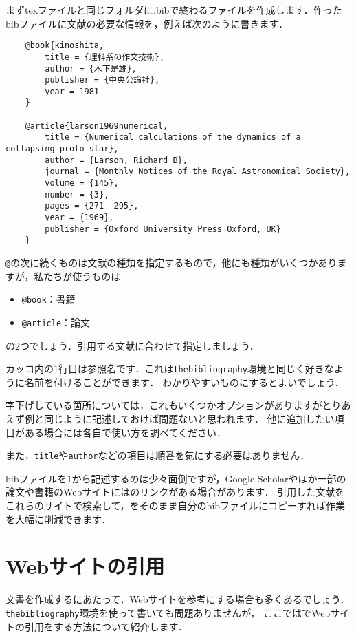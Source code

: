 \documentclass[a4paper, 11pt, uplatex]{jsreport}
\numberwithin{equation}{section}
\theoremstyle{definition}
\begin{document}
まずtexファイルと同じフォルダに.bibで終わるファイルを作成します．作ったbibファイルに文献の必要な情報を，例えば次のように書きます．
\begin{verbatim}
    @book{kinoshita,
        title = {理科系の作文技術},
        author = {木下是雄},
        publisher = {中央公論社},
        year = 1981
    }

    @article{larson1969numerical,
        title = {Numerical calculations of the dynamics of a collapsing proto-star},
        author = {Larson, Richard B},
        journal = {Monthly Notices of the Royal Astronomical Society},
        volume = {145},
        number = {3},
        pages = {271--295},
        year = {1969},
        publisher = {Oxford University Press Oxford, UK}
    }
\end{verbatim}

\verb|@|の次に続くものは文献の種類を指定するもので，他にも種類がいくつかありますが，私たちが使うものは
\begin{itemize}
    \item \verb|@book|：書籍
    \item \verb|@article|：論文
\end{itemize}
の2つでしょう．引用する文献に合わせて指定しましょう．

カッコ内の1行目は参照名です．これは\verb|thebibliography|環境と同じく好きなように名前を付けることができます．
わかりやすいものにするとよいでしょう．

字下げしている箇所については，これもいくつかオプションがありますがとりあえず例と同じように記述しておけば問題ないと思われます．
他に追加したい項目がある場合には各自で使い方を調べてください．

また，\verb|title|や\verb|author|などの項目は順番を気にする必要はありません．

bibファイルを1から記述するのは少々面倒ですが，Google Scholarやほか一部の論文や書籍のWebサイトには{\BibTeX}のリンクがある場合があります．
引用した文献をこれらのサイトで検索して，{\BibTeX}をそのまま自分のbibファイルにコピーすれば作業を大幅に削減できます．


\section{Webサイトの引用}

文書を作成するにあたって，Webサイトを参考にする場合も多くあるでしょう．\verb|thebibliography|環境を使って書いても問題ありませんが，
ここでは{\BibTeX}でWebサイトの引用をする方法について紹介します．
\end{document}
